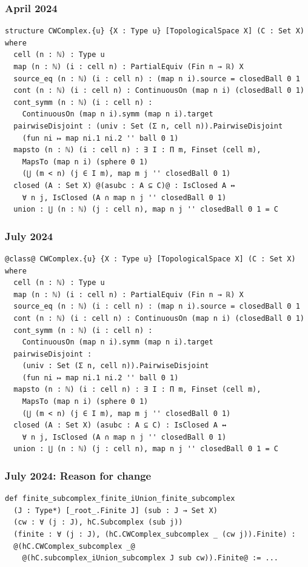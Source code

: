 \documentclass{beamer}
\begin{document}
\begin{frame}[fragile]
\frametitle{April 2024}
\begin{lstlisting}[basicstyle=\ttfamily\scriptsize]
structure CWComplex.{u} {X : Type u} [TopologicalSpace X] (C : Set X) where
  cell (n : ℕ) : Type u
  map (n : ℕ) (i : cell n) : PartialEquiv (Fin n → ℝ) X
  source_eq (n : ℕ) (i : cell n) : (map n i).source = closedBall 0 1
  cont (n : ℕ) (i : cell n) : ContinuousOn (map n i) (closedBall 0 1)
  cont_symm (n : ℕ) (i : cell n) : 
    ContinuousOn (map n i).symm (map n i).target
  pairwiseDisjoint : (univ : Set (Σ n, cell n)).PairwiseDisjoint 
    (fun ni ↦ map ni.1 ni.2 '' ball 0 1)
  mapsto (n : ℕ) (i : cell n) : ∃ I : Π m, Finset (cell m),
    MapsTo (map n i) (sphere 0 1) 
    (⋃ (m < n) (j ∈ I m), map m j '' closedBall 0 1)
  closed (A : Set X) @(asubc : A ⊆ C)@ : IsClosed A ↔ 
    ∀ n j, IsClosed (A ∩ map n j '' closedBall 0 1)
  union : ⋃ (n : ℕ) (j : cell n), map n j '' closedBall 0 1 = C
\end{lstlisting}
\end{frame}

\begin{frame}[fragile]
\frametitle{July 2024}
\begin{lstlisting}[basicstyle=\ttfamily\scriptsize]
@class@ CWComplex.{u} {X : Type u} [TopologicalSpace X] (C : Set X) where
  cell (n : ℕ) : Type u
  map (n : ℕ) (i : cell n) : PartialEquiv (Fin n → ℝ) X
  source_eq (n : ℕ) (i : cell n) : (map n i).source = closedBall 0 1
  cont (n : ℕ) (i : cell n) : ContinuousOn (map n i) (closedBall 0 1)
  cont_symm (n : ℕ) (i : cell n) : 
    ContinuousOn (map n i).symm (map n i).target
  pairwiseDisjoint :
    (univ : Set (Σ n, cell n)).PairwiseDisjoint 
    (fun ni ↦ map ni.1 ni.2 '' ball 0 1)
  mapsto (n : ℕ) (i : cell n) : ∃ I : Π m, Finset (cell m),
    MapsTo (map n i) (sphere 0 1) 
    (⋃ (m < n) (j ∈ I m), map m j '' closedBall 0 1)
  closed (A : Set X) (asubc : A ⊆ C) : IsClosed A ↔ 
    ∀ n j, IsClosed (A ∩ map n j '' closedBall 0 1)
  union : ⋃ (n : ℕ) (j : cell n), map n j '' closedBall 0 1 = C
\end{lstlisting}
\end{frame}

\begin{frame}[fragile]
\frametitle{July 2024: Reason for change}
\begin{lstlisting}[basicstyle=\ttfamily\scriptsize]
def finite_subcomplex_finite_iUnion_finite_subcomplex 
  (J : Type*) [_root_.Finite J] (sub : J → Set X) 
  (cw : ∀ (j : J), hC.Subcomplex (sub j))
  (finite : ∀ (j : J), (hC.CWComplex_subcomplex _ (cw j)).Finite) : 
  @(hC.CWComplex_subcomplex _@
    @(hC.subcomplex_iUnion_subcomplex J sub cw)).Finite@ := ...
\end{lstlisting}
\end{frame}
\end{document}
